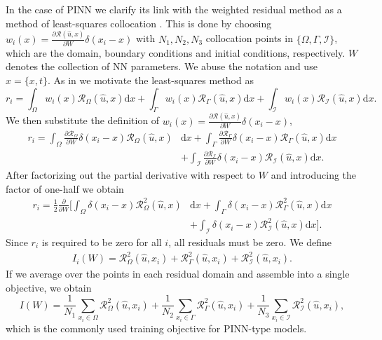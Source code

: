 \documentclass[11pt, fleqn]{article}
\def\cR{{\mathcal R}}
\def\cR{{\mathcal R}}
\def\md{{\mathrm d}}
\begin{document}
In the case of \gls*{PINN} we clarify its link with the weighted residual method as a method of least-squares collocation \cite{finlayson2013method}. This is done by choosing $w_i(x) = \frac{\partial \cR(\hat{u}, x)}{\partial W}\delta(x_{i} - x)$ with $N_1,N_2,N_3$ collocation points in $\{\Omega, \Gamma, \mathcal{I}\}$, which are the domain, boundary conditions and initial conditions, respectively. $W$ denotes the collection of NN parameters. We abuse the notation and use $x =\{x, t\}$. As in \cite{finlayson1966method} we motivate the least-squares method as 
\begin{equation}
    r_i = \int_{\Omega}w_i(x)\cR_{\Omega}(\hat{u}, x)\md x + \int_\Gamma w_i(x)\cR_{\Gamma}(\hat{u}, x)\md x + \int_{\mathcal{I}} w_i(x)\cR_{\mathcal{I}}(\hat{u}, x)\md x.
\end{equation}
We then substitute the definition of $w_i(x) = \frac{\partial \cR(\hat{u}, x)}{\partial W}\delta(x_{i} - x)$,
\begin{align}
     r_i =  \int_{\Omega}\frac{\partial \cR_{\Omega}}{\partial W}\delta(x_{i} - x)\cR_{\Omega}(\hat{u}, x) & \md x +  \int_\Gamma \frac{\partial \cR_{\Gamma}}{\partial W}\delta(x_{i} - x) \cR_{\Gamma}(\hat{u}, x)\md x \nonumber\\
     & + \int_{\mathcal{I}} \frac{\partial \cR_{\mathcal{I}}}{\partial W} \delta(x_{i} - x) \cR_{\mathcal{I}}(\hat{u}, x)\md x.
\end{align}
After factorizing out the partial derivative with respect to $W$ and introducing the factor of one-half we obtain
\begin{align}
     r_i =  \frac{1}{2}\frac{\partial}{\partial W}\bigg[\int_{\Omega}\delta(x_{i} - x)\cR^2_{\Omega}(\hat{u}, x) & \md x +   \int_\Gamma \delta(x_{i} - x) \cR^2_{\Gamma}(\hat{u}, x)\md x \nonumber\\
     & +  \int_{\mathcal{I}}  \delta(x_{i} - x) \cR^2_{\mathcal{I}}(\hat{u}, x)\md x\bigg].
\end{align}
Since $r_i$ is required to be zero for all $i$, all residuals must be zero. We define
\begin{align}
     I_i(W) =  \cR^2_{\Omega}(\hat{u}, x_{i}) +  \cR^2_{\Gamma}(\hat{u}, x_{i}) +   \cR^2_{\mathcal{I}}(\hat{u}, x_{i}).
\end{align}
If we average over the points in each residual domain and assemble into a single objective, we obtain
\begin{equation}
    I(W) = \frac{1}{N_1}\sum_{x_{i}\in\Omega}\cR^2_{\Omega}(\hat{u}, x_{i}) +  \frac{1}{N_2}\sum_{x_i\in\Gamma} \cR^2_{\Gamma}(\hat{u}, x_{i}) + \frac{1}{N_3}\sum_{x_i\in\mathcal{I}} \cR^2_{\mathcal{I}}(\hat{u}, x_{i}),
\end{equation}
which is the commonly used training objective for \gls*{PINN}-type models.
\end{document}
